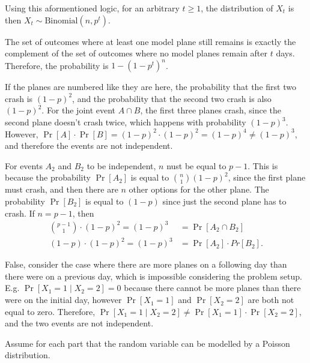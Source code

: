 \documentclass[11pt]{article}
\begin{document}
\begin{solution}
\begin{Parts}
\Part Using this aformentioned logic, for an arbitrary $t \geq 1$, the
distribution of $X_t$ is then $X_t \sim \mathrm{Binomial}(n, p^t)$.

\Part The set of outcomes where at least one model plane still remains is exactly
the complement of the set of outcomes where no model planes remain after $t$ days.
Therefore, the probability is $1-(1-p^t)^n$. 

\Part If the planes are numbered like they are here, the probability that the
first two crash is $(1-p)^2$, and the probability that the second two crash is
also $(1-p)^2$. For the joint event $A \cap B$, the first three planes crash,
since the second plane doesn't crash twice, which happens with probability
$(1-p)^3$. However, $\Pr[A] \cdot \Pr[B] = (1-p)^2 \cdot (1-p)^2 = (1-p)^4
\neq (1-p)^3$, and therefore the events are not independent. 

\Part For events $A_2$ and $B_2$ to be independent, $n$ nust be equal to $p-1$.
This is because the probability $\Pr[A_2]$ is equal to $\binom{n}{1}(1-p)^2$, 
since the first plane must crash, and then there are $n$ other options for the
other plane. The probability $\Pr[B_2]$ is equal to $(1-p)$ since just the 
second plane has to crash. If $n=p-1$, then
\[
    \begin{split}
        \binom{p-1}{1}\cdot(1-p)^2 = (1-p)^3 &= \Pr[A_2 \cap B_2] \\
        (1-p)\cdot(1-p)^2 = (1-p)^3 &= \Pr[A_2] \cdot Pr[B_2].
    \end{split}
\]

\Part False, consider the case where there are more planes on a following day 
than there were on a previous day, which is impossible considering the problem 
setup. E.g. $\Pr[X_1 = 1 \mid X_2 = 2] = 0$ because there cannot be more planes
than there were on the initial day, however $\Pr[X_1 = 1]$ and $\Pr[X_2 = 2]$ 
are both not equal to zero. Therefore, $\Pr[X_1 = 1 \mid X_2 = 2] \neq \Pr[X_1 = 1]
\cdot \Pr[X_2 = 2]$, and the two events are not independent. 

\end{Parts}

\end{solution}

Assume for each part that the random variable can be modelled by a Poisson 
distribution.
\end{document}
